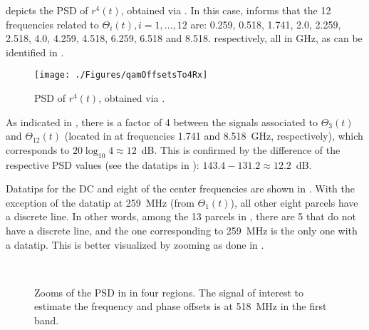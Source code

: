  depicts the PSD of $r^4(t)$, obtained via .
In this case,  informs that
the 12 frequencies related to $\Theta_i(t), i=1,\ldots,12$ are:
0.259, 0.518,    1.741,    2.0, 2.259,    2.518,
    4.0, 4.259,    4.518,    6.259,    6.518 and   8.518.
respectively, all in GHz, as can be identified in .

\begin{figure}[htbp]
\centering
\texttt{[image: ./Figures/qamOffsetsTo4Rx]}
\caption{PSD of $r^4(t)$, obtained via .\label{fig:qamOffsetsTo4Rx}}
\end{figure}

As indicated in , there is a factor of 4 between the signals
associated to $\Theta_3(t)$ and $\Theta_{12}(t)$ (located in 
at frequencies 1.741 and 8.518~GHz, respectively), which corresponds to
$20 \log_{10} 4 \approx 12$~dB. This is confirmed by the difference of the
respective PSD values (see the datatips in ): $143.4-131.2 \approx 12.2$~dB.

Datatips for the DC and eight of the center frequencies are shown in . With the exception of the datatip at 259~MHz (from $\Theta_1(t)$), all other eight parcels have a
discrete line. In other words, among the 13 parcels in , there are 5
that do not have a discrete line, and the one corresponding to 259~MHz is the only one with
a datatip. This is better visualized by zooming  as done in 
.

\begin{figure}[!htb]
  \begin{center}
    \\
  \end{center}
  \caption[Zooms of the PSD in  in four regions.]{Zooms of the PSD in  in four regions. The signal of interest to
estimate the frequency and phase offsets is at 518~MHz in the first band.\label{fig:qamOffsetsTo4RxAllZooms}}  
\end{figure}

